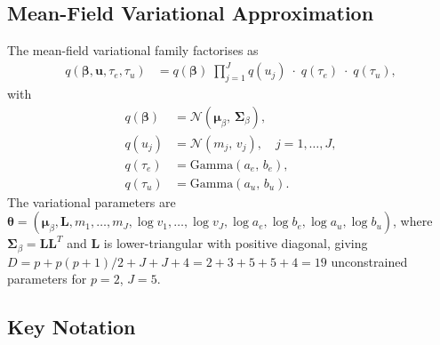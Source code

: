 \documentclass[11pt,a4paper]{article}
\newcommand{\N}{\mathcal{N}}
\begin{document}
\subsection{Mean-Field Variational Approximation}

The mean-field variational family factorises as
\begin{align}
q(\bm{\beta},\mathbf{u},\tau_e,\tau_u)
  &= q(\bm{\beta})\;\prod_{j=1}^{J} q(u_j)\;\cdot\; q(\tau_e)\;\cdot\; q(\tau_u),
\end{align}
with
\begin{align}
q(\bm{\beta}) &= \N(\bm{\mu}_\beta,\,\bm{\Sigma}_\beta), \\
q(u_j) &= \mathcal{N}(m_j,\, v_j), \quad j=1,\ldots,J, \\
q(\tau_e) &= \mathrm{Gamma}(a_e,\, b_e), \\
q(\tau_u) &= \mathrm{Gamma}(a_u,\, b_u).
\end{align}
The variational parameters are
$\bm{\theta} = (\bm{\mu}_\beta, \bm{L}, m_1,\ldots,m_J, \log v_1,\ldots,\log v_J,
\log a_e, \log b_e, \log a_u, \log b_u)$,
where $\bm{\Sigma}_\beta = \bm{L}\bm{L}^T$ and $\bm{L}$ is lower-triangular with
positive diagonal, giving $D = p + p(p+1)/2 + J + J + 4 = 2 + 3 + 5 + 5 + 4 = 19$
unconstrained parameters for $p=2$, $J=5$.

\subsection{Key Notation}
\end{document}
